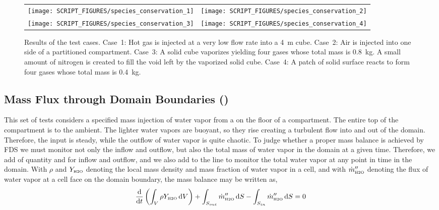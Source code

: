 \documentclass[11pt]{book}
\begin{document}
\begin{figure}[ht]
\begin{tabular*}{\textwidth}{lr}
\texttt{[image: SCRIPT\_FIGURES/species\_conservation\_1]} &
\texttt{[image: SCRIPT\_FIGURES/species\_conservation\_2]} \\
\texttt{[image: SCRIPT\_FIGURES/species\_conservation\_3]} &
\texttt{[image: SCRIPT\_FIGURES/species\_conservation\_4]}
\end{tabular*}
\caption[The  test cases]{Results of the  test cases. Case~1: Hot gas is injected at a very low flow rate into a 4~m cube. Case~2: Air is injected into one side of a partitioned compartment. Case~3: A solid cube vaporizes yielding four gases whose total mass is 0.8~kg. A small amount of nitrogen is created to fill the void left by the vaporized solid cube. Case~4: A patch of solid surface reacts to form four gases whose total mass is 0.4~kg.}
\label{species_conservation}
\end{figure}

\subsection{Mass Flux through Domain Boundaries (\texorpdfstring{}{mass\_flux\_wall})}
\label{mass_flux_wall}

This set of tests considers a specified mass injection of water vapor from a  on the floor of a compartment.  The entire top of the compartment is  to the ambient.  The lighter water vapors are buoyant, so they rise creating a turbulent flow into and out of the domain.  Therefore, the input is steady, while the outflow of water vapor is quite chaotic.  To judge whether a proper mass balance is achieved by FDS we must monitor not only the inflow and outflow, but also the total mass of water vapor in the domain at a given time.  Therefore, we add  of quantity  and  for inflow and outflow, and we also add  to the  line to monitor the total water vapor at any point in time in the domain.  With $\rho$ and $Y_{\mbox{\tiny H2O}}$ denoting the local mass density and mass fraction of water vapor in a cell, and with $\dot{m}_{\mbox{\tiny H2O}}^{\prime\prime}$ denoting the flux of water vapor at a cell face on the domain boundary, the mass balance may be written as,
\begin{equation}
\label{eq:H2O_mass_balance}
\frac{\mbox{d}}{\mbox{d}t} \left( \int_{V} \rho Y_{\mbox{\tiny H2O}} \,\mbox{d}V \right) + \int_{S_{out}} \dot{m}_{\mbox{\tiny H2O}}^{\prime\prime} \,\mbox{d}S - \int_{S_{in}} \dot{m}_{\mbox{\tiny H2O}}^{\prime\prime} \,\mbox{d}S = 0
\end{equation}
\end{document}

